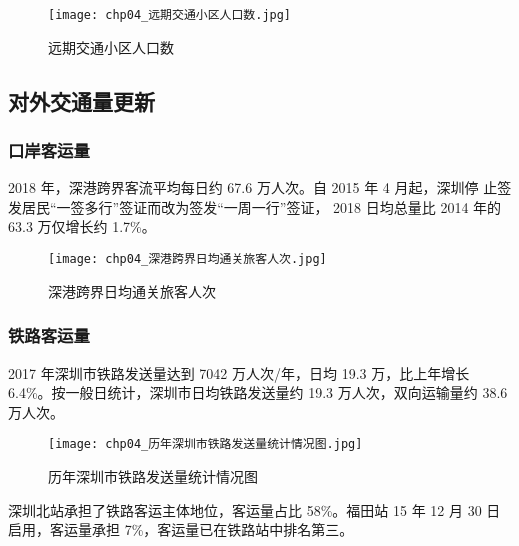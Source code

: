 \begin{figure}[!ht]
  \centering
  \texttt{[image: chp04\_远期交通小区人口数.jpg]}
  \caption{远期交通小区人口数\label{fig:chp04_远期交通小区人口数} }
\end{figure}

\subsection{对外交通量更新}
\subsubsection{口岸客运量}
2018 年，深港跨界客流平均每日约 67.6 万人次。自 2015 年 4 月起，深圳停
止签发居民“一签多行”签证而改为签发“一周一行”签证， 2018 日均总量比
2014 年的 63.3 万仅增长约 1.7\%。

\begin{figure}[!ht]
  \centering
  \texttt{[image: chp04\_深港跨界日均通关旅客人次.jpg]}
  \caption{深港跨界日均通关旅客人次 \protect\footnotemark\label{fig:chp04_深港跨界日均通关旅客人次}}
\end{figure}

\subsubsection{铁路客运量}
2017 年深圳市铁路发送量达到 7042 万人次/年，日均 19.3 万，比上年增长
6.4\%。按一般日统计，深圳市日均铁路发送量约 19.3 万人次，双向运输量约 38.6万人次。\clearpage

\begin{figure}[!ht]
  \centering
  \texttt{[image: chp04\_历年深圳市铁路发送量统计情况图.jpg]}
  \caption{历年深圳市铁路发送量统计情况图 \protect\footnotemark} \label{fig:chp04_历年深圳市铁路发送量统计情况图}
\end{figure}

深圳北站承担了铁路客运主体地位，客运量占比 58\%。福田站 15 年 12 月
30 日启用，客运量承担 7\%，客运量已在铁路站中排名第三。

